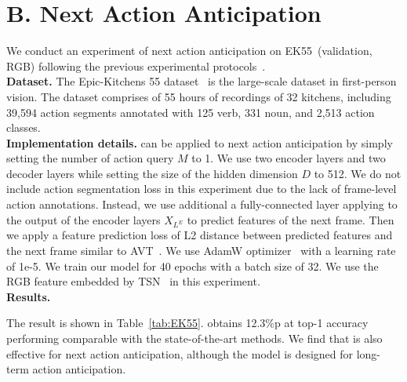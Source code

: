 \section*{B. Next Action Anticipation}
We conduct an experiment of next action anticipation on EK55~(validation, RGB) following the previous experimental protocols~\cite{girdhar2021anticipative,sener2020temporal,furnari2019would}.
\\
\noindent
\textbf{Dataset.}
The Epic-Kitchens 55 dataset~\cite{Damen2018EPICKITCHENS} is the large-scale dataset in first-person vision. The dataset comprises of 55 hours of recordings of 32 kitchens, including 39,594 action segments annotated with 125 verb, 331 noun, and 2,513 action classes. 
\\
\noindent
\textbf{Implementation details.}
\ours can be applied to next action anticipation by simply setting the number of action query $M$ to 1.
We use two encoder layers and two decoder layers while setting the size of the hidden dimension $D$ to 512.
We do not include action segmentation loss in this experiment due to the
lack of frame-level action annotations. 
Instead, we use additional a fully-connected layer applying to the output of the encoder layers $X_{L^E}$ to predict features of the next frame. Then we apply a feature prediction loss of L2 distance between predicted features and the next frame similar to AVT~\cite{girdhar2021anticipative}.
We use AdamW optimizer~\cite{loshchilov2017decoupled} with a learning rate of 1e-5. We train our model for 40 epochs with a batch size of 32.
We use the RGB feature embedded by TSN~\cite{wang2016_TemporalSegmentNetworks} in this experiment. 
\\
\noindent
\textbf{Results.}

The result is shown in Table~\ref{tab:EK55}. \ours obtains 12.3\%p at top-1 accuracy performing comparable with the state-of-the-art methods. We find that \ours is also effective for next action anticipation, although the model is designed for long-term action anticipation. 

